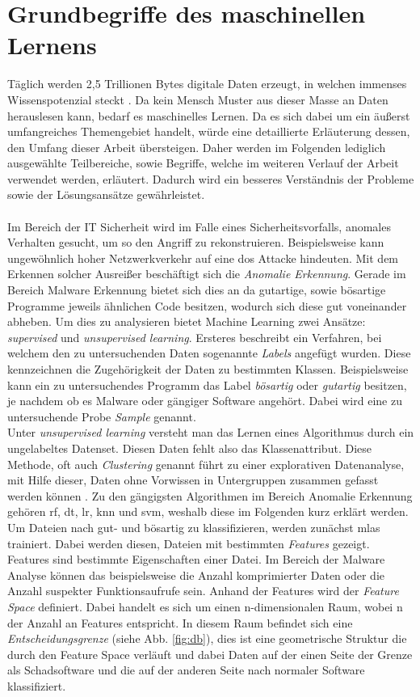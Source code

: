 \documentclass[
    12pt, %
    DIV10,
    ngerman, %
    a4paper, %
    oneside, %
    titlepage, %
    parskip=half, %
    headings=normal, %
    listof=totoc, %
    bibliography=totoc, %
    index=totoc, %
    captions=tableheading, %
    final %
]{scrreprt}
\begin{document}
\section{Grundbegriffe des maschinellen Lernens}\label{sec:ml}
Täglich werden 2,5 Trillionen Bytes digitale Daten erzeugt, in welchen immenses Wissenspotenzial steckt \parencite{MerlinOne}. Da kein Mensch Muster aus dieser Masse an Daten herauslesen kann, bedarf es maschinelles Lernen. Da es sich dabei um ein äu{\ss}erst umfangreiches Themengebiet handelt, würde eine detaillierte Erläuterung dessen, den Umfang dieser Arbeit übersteigen. Daher werden im Folgenden lediglich ausgewählte Teilbereiche, sowie Begriffe, welche im weiteren Verlauf der Arbeit verwendet werden, erläutert. Dadurch wird ein besseres Verständnis der Probleme sowie der Lösungsansätze gewährleistet.\\\\
Im Bereich der IT Sicherheit wird im Falle eines Sicherheitsvorfalls, anomales Verhalten gesucht, um so den Angriff zu rekonstruieren. Beispielsweise kann ungewöhnlich hoher Netzwerkverkehr auf eine \ac{dos} Attacke hindeuten. Mit dem Erkennen solcher Ausrei{\ss}er beschäftigt sich die \emph{Anomalie Erkennung}. Gerade im Bereich Malware Erkennung bietet sich dies an da gutartige, sowie bösartige Programme jeweils ähnlichen Code besitzen, wodurch sich diese gut voneinander abheben. Um dies zu analysieren bietet Machine Learning zwei Ansätze: \emph{supervised} und \emph{unsupervised learning}. Ersteres beschreibt ein Verfahren, bei welchem den zu untersuchenden Daten sogenannte \emph{Labels} angefügt wurden. Diese kennzeichnen die Zugehörigkeit der Daten zu bestimmten Klassen. Beispielsweise kann ein zu untersuchendes Programm das Label \emph{bösartig} oder \emph{gutartig} besitzen, je nachdem ob es Malware oder gängiger Software angehört. Dabei wird eine zu untersuchende Probe \emph{Sample} genannt.\\
Unter \emph{unsupervised learning} versteht man das Lernen eines Algorithmus durch ein ungelabeltes Datenset. Diesen Daten fehlt also das Klassenattribut. Diese Methode, oft auch \emph{Clustering} genannt führt zu einer explorativen Datenanalyse, mit Hilfe dieser, Daten ohne Vorwissen in Untergruppen zusammen gefasst werden können \parencite{raschka2017python}.
Zu den gängigsten Algorithmen im Bereich Anomalie Erkennung gehören \ac{rf}, \ac{dt}, \ac{lr}, \ac{knn} und \ac{svm}, weshalb diese im Folgenden kurz erklärt werden.\\
Um Dateien nach gut- und bösartig zu klassifizieren, werden zunächst \ac{mlas} trainiert. Dabei werden diesen, Dateien mit bestimmten \emph{Features} gezeigt. Features sind bestimmte Eigenschaften einer Datei. Im Bereich der Malware Analyse können das beispielsweise die Anzahl komprimierter Daten oder die Anzahl suspekter Funktionsaufrufe sein. Anhand der Features wird der \emph{Feature Space} definiert. Dabei handelt es sich um einen n-dimensionalen Raum, wobei n der Anzahl an Features entspricht. In diesem Raum befindet sich eine \emph{Entscheidungsgrenze} (siehe Abb. \ref{fig:db}), dies ist eine geometrische Struktur die durch den Feature Space verläuft und dabei Daten auf der einen Seite der Grenze als Schadsoftware und die auf der anderen Seite nach normaler Software klassifiziert.
\end{document}
